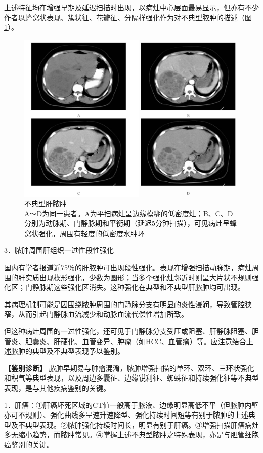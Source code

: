 上述特征均在增强早期及延迟扫描时出现，以病灶中心层面最易显示，但亦有不少作者以蜂窝状表现、簇状征、花瓣征、分隔样强化作为对不典型脓肿的描述（图\ref{fig11-12}）。

\begin{figure}[!htbp]
 \centering
 \includegraphics[width=.7\textwidth,height=\textheight,keepaspectratio]{./images/Image00284.jpg}
 \captionsetup{justification=centering}
 \caption{不典型肝脓肿\\{\small A～D为同一患者。A为平扫病灶呈边缘模糊的低密度灶；B、C、D分别为动脉期、门静脉期和平衡期（延迟5分钟扫描），可见病灶呈蜂窝状强化，周围有轻度的低密度水肿环}}
 \label{fig11-12}
  \end{figure} 

3．脓肿周围肝组织一过性段性强化

国内有学者报道近75％的肝脓肿可出现段性强化。表现在增强扫描动脉期，病灶周围的肝实质出现楔形强化，少数为圆形；当多个强化灶邻近时则呈大片状不规则强化区；门静脉期这些强化区消失。这种强化在典型和不典型肝脓肿均可出现。

其病理机制可能是因围绕脓肿周围的门静脉分支有明显的炎性浸润，导致管腔狭窄，从而引起门静脉血流减少和动脉血流代偿性增加所致。

但这种病灶周围的一过性强化，还可见于门静脉分支受压或阻塞、肝静脉阻塞、胆管炎、胆囊炎、肝硬化、血管变异、肿瘤（如HCC、血管瘤）等。应注意结合上述脓肿的典型及不典型表现予以鉴别。

\textbf{【鉴别诊断】}
脓肿早期易与肿瘤混淆，脓肿增强扫描的单环、双环、三环状强化和积气等典型表现，以及周边多囊征、边缘锐利征、蜘蛛征和持续强化征等不典型表现，是与其他疾病鉴别的关键。

1．肝癌：①肝癌坏死区域的CT值一般高于脓液、边缘明显高低不平（但脓肿内壁亦可不规则）、强化曲线多呈速升速降型、强化持续时间短等有别于脓肿的上述典型及不典型表现。②脓肿强化持续时间长，明显有别于肝癌。③增强扫描肝癌病灶多无缩小趋势，而脓肿常见。④掌握上述不典型脓肿之特殊表现，亦是与胆管细胞癌鉴别的关键。

